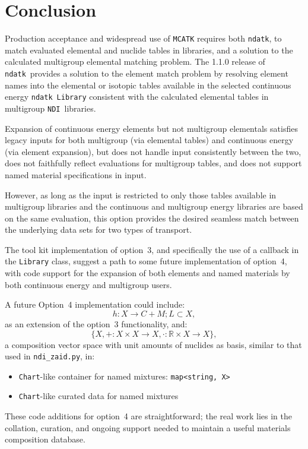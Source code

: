 \documentclass[12pt]{lamemo}
\newcommand{\ndatk}{\texttt{ndatk}}
\newcommand{\MCATK}{\texttt{MCATK}}
\newcommand{\NDI}{\texttt{NDI}}
\begin{document}
\section{Conclusion}

Production acceptance and widespread use of \MCATK\cite{adams14}
requires both \ndatk, to match evaluated elemental and nuclide tables
in libraries, and a solution to the calculated multigroup elemental
matching problem.  The 1.1.0 release of \ndatk\ provides a solution to
the element match problem by resolving element names into the
elemental or isotopic tables available in the selected continuous
energy \ndatk\ \texttt{Library} consistent with the calculated
elemental tables in multigroup \NDI\ libraries.

Expansion of continuous energy elements but not multigroup elementals
satisfies legacy inputs for both multigroup (via elemental tables) and
continuous energy (via element expansion), but does not handle input
consistently between the two, does not faithfully reflect evaluations
for multigroup tables, and does not support named material
specifications in input.

However, as long as the input is restricted to only those tables
available in multigroup libraries and the continuous and multigroup
energy libraries are based on the same evaluation, this option
provides the desired seamless match between the underlying data sets
for two types of transport.

The tool kit implementation of option~3, and specifically the use of a
callback in the \texttt{Library} class, suggest a path to some future
implementation of option~4, with code support for the expansion of both
elements and named materials by both continuous energy and multigroup
users.
 
A future Option~4 implementation could include:
\[
h:X \rightarrow C+M; L \subset X,
\]
as an extension of the option~3 functionality, and:
\[ 
\{X, +:X\times X \rightarrow X, \cdot:\mathbb{R}\times X \rightarrow X \},
\]
a composition vector space with unit amounts of nuclides as basis,
similar to that used in \texttt{ndi\_zaid.py}, in:
\begin{itemize}
\item \texttt{Chart}-like container for named mixtures:
  \texttt{map<string, X>}
\item \texttt{Chart}-like curated data for named mixtures
\end{itemize}
These code additions for option~4 are straightforward; the real work
lies in the collation, curation, and ongoing support needed to
maintain a useful materials composition database.
\end{document}
